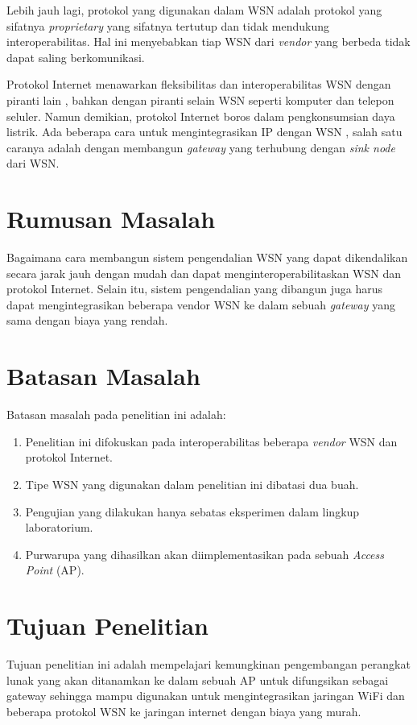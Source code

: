 Lebih jauh lagi, protokol yang digunakan dalam WSN adalah protokol yang sifatnya \emph{proprietary} yang sifatnya tertutup dan tidak mendukung interoperabilitas. Hal ini menyebabkan tiap WSN dari \emph{vendor} yang berbeda tidak dapat saling berkomunikasi.

Protokol Internet menawarkan fleksibilitas dan interoperabilitas WSN dengan piranti lain \cite{Hwang2003}, bahkan dengan piranti selain WSN seperti komputer dan telepon seluler. Namun demikian, protokol Internet boros dalam pengkonsumsian daya listrik. Ada beberapa cara untuk mengintegrasikan IP dengan WSN \cite{Rodrigues2010}, salah satu caranya adalah dengan membangun \emph{gateway} \cite{DaSilvaCampos2011} yang terhubung dengan \emph{sink node} dari WSN.


\section{Rumusan Masalah}
Bagaimana cara membangun sistem pengendalian WSN yang dapat dikendalikan secara jarak jauh dengan mudah dan dapat menginteroperabilitaskan WSN dan protokol Internet. Selain itu, sistem pengendalian yang dibangun juga harus dapat mengintegrasikan beberapa vendor WSN ke dalam sebuah \emph{gateway} yang sama dengan biaya yang rendah.


\section{Batasan Masalah}
Batasan masalah pada penelitian ini adalah:
\begin{enumerate}
\item Penelitian ini difokuskan pada interoperabilitas beberapa \emph{vendor} WSN dan protokol Internet.
\item Tipe WSN yang digunakan dalam penelitian ini dibatasi dua buah.
\item Pengujian yang dilakukan hanya sebatas eksperimen dalam lingkup laboratorium.
\item Purwarupa yang dihasilkan akan diimplementasikan pada sebuah \emph{Access Point} (AP).
\end{enumerate}


\section{Tujuan Penelitian}
Tujuan penelitian ini adalah mempelajari kemungkinan pengembangan perangkat lunak yang akan ditanamkan ke dalam sebuah AP untuk difungsikan sebagai gateway sehingga mampu digunakan untuk mengintegrasikan jaringan WiFi dan beberapa protokol WSN ke jaringan internet dengan biaya yang murah.


